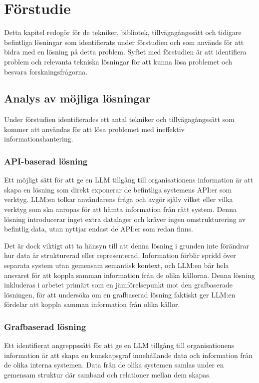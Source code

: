 \section{Förstudie}\label{sec:prestudy}

Detta kapitel redogör för de tekniker, bibliotek, tillvägagångssätt och tidigare befintliga lösningar som identifierats under förstudien och som används för att bidra med en lösning på detta problem.
Syftet med förstudien är att identifiera problem och relevanta tekniska lösningar för att kunna lösa problemet och besvara forskningsfrågorna.

\subsection{Analys av möjliga lösningar}
Under förstudien identifierades ett antal tekniker och tillvägagångssätt som kommer att användas för att lösa problemet med ineffektiv informationshantering.

\subsubsection{API-baserad lösning}

Ett möjligt sätt för att ge en LLM tillgång till organisationens information är att skapa en lösning som direkt exponerar de befintliga systemens API:er som verktyg.
LLM:en tolkar användarens fråga och avgör själv vilket eller vilka verktyg som ska anropas för att hämta information från rätt system.
Denna lösning introducerar inget extra datalager och kräver ingen omstrukturering av befintlig data, utan nyttjar endast de API:er som redan finns.

Det är dock viktigt att ta hänsyn till att denna lösning i grunden inte förändrar hur data är strukturerad eller representerad.
Information förblir spridd över separata system utan gemensam semantisk kontext, och LLM:en bär hela ansvaret för att koppla samman information från de olika källorna.
Denna lösning inkluderas i arbetet primärt som en jämförelsepunkt mot den grafbaserade lösningen, för att undersöka om en grafbaserad lösning faktiskt ger LLM:en fördelar att koppla samman information från olika källor.


\subsubsection{Grafbaserad lösning}

Ett identifierat angreppssätt för att ge en LLM tillgång till organisationens information är att skapa en kunskapsgraf innehållande data och information från de olika interna systemen.
Data från de olika systemen samlas under en gemensam struktur där samband och relationer mellan dem skapas.

